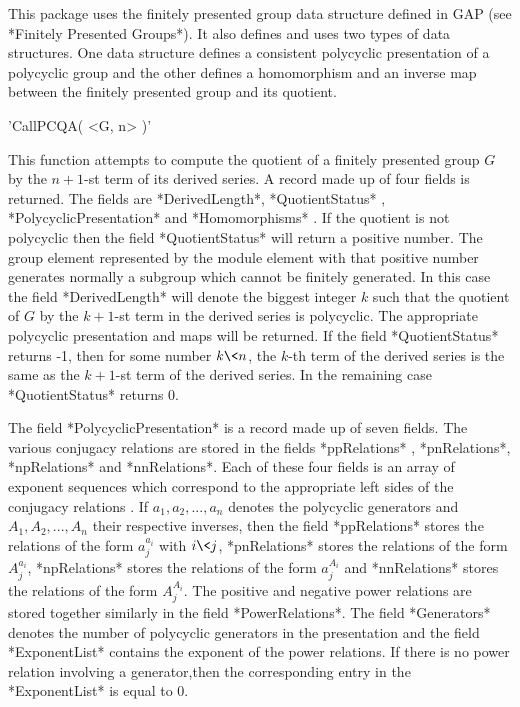

This package uses the finitely presented group data structure  defined in
GAP (see *Finitely Presented Groups*). It also defines and uses two types
of  data structures.  One data structure defines a  consistent polycyclic
presentation of a  polycyclic group and the other defines a  homomorphism
and an inverse map between the finitely presented group and its quotient.



'CallPCQA( <G, n> )'

This  function attempts to compute the   quotient of a finitely presented
group $G$ by  the $n+1$-st term of its  derived series.  A record made up
of   four   fields   is  returned.     The    fields are *DerivedLength*,
*QuotientStatus* , *PolycyclicPresentation* and *Homomorphisms* .  If the
quotient is not polycyclic then the field  *QuotientStatus* will return a
positive number.    The group element represented   by the module element
with that positive  number generates normally  a subgroup which cannot be
finitely generated.  In this  case the field *DerivedLength* will  denote
the  biggest integer $k$ such  that the quotient of   $G$ by the $k+1$-st
term in the derived  series  is polycyclic.  The appropriate   polycyclic
presentation  and maps will be   returned. If the field  *QuotientStatus*
returns -1, then for some number $k \< n$, the $k$-th term of the derived
series is  the same as  the $k+1$-st term of  the derived  series. In the
remaining case *QuotientStatus* returns 0.

The  field *PolycyclicPresentation* is a  record made up of seven fields.
The various conjugacy relations are stored in  the fields *ppRelations* ,
*pnRelations*, *npRelations* and *nnRelations*. Each of these four fields
is  an array of  exponent  sequences which correspond  to the appropriate
left sides of the conjugacy relations .  If $a_1,a_2,...,a_n$ denotes the
polycyclic  generators  and $A_1,A_2,...,A_n$  their respective inverses,
then the field *ppRelations* stores the relations of the form $a_j^{a_i}$
with  $i  \<  j$, *pnRelations*     stores  the relations  of  the   form
$A_j^{a_i}$, *npRelations* stores the  relations of the form  $a_j^{A_i}$
and  *nnRelations* stores  the relations  of  the form  $A_j^{A_i}$.  The
positive  and negative power relations  are  stored together similarly in
the field *PowerRelations*.  The field *Generators* denotes the number of
polycyclic  generators in the presentation  and  the field *ExponentList*
contains the exponent   of the power  relations.   If there  is no  power
relation  involving a  generator,then   the  corresponding entry  in  the
*ExponentList* is equal to 0.

